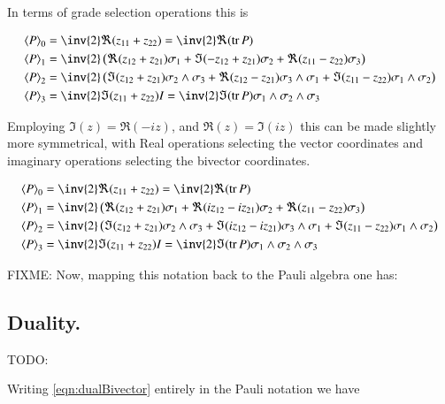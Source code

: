 \documentclass{article}
\DeclareMathOperator{\tr}{tr}
\newcommand{\trace}[1]{\tr{#1}}
\begin{document}
In terms of grade selection operations this is

\begin{align*}
\gpgradezero{P} &= \inv{2} \Re( z_{11} + z_{22} ) = \inv{2} \Re(\trace P) \\
\gpgradeone{P} &= \inv{2} \left(
\Re( z_{12} + z_{21} ) \sigma_1
+\Im( -z_{12} + z_{21} ) \sigma_2
+\Re( z_{11} - z_{22} ) \sigma_3
\right) \\
\gpgradetwo{P}
&= \inv{2} \left(
\Im( z_{12} + z_{21} ) \sigma_2 \wedge \sigma_3
+\Re( z_{12} - z_{21} ) \sigma_3 \wedge \sigma_1
+\Im( z_{11} - z_{22} ) \sigma_1 \wedge \sigma_2
\right) \\
\gpgradethree{P} &= \inv{2} \Im( z_{11} + z_{22} ) I = \inv{2} \Im(\trace P) \sigma_1 \wedge \sigma_2 \wedge \sigma_3
\end{align*}

Employing $\Im(z) = \Re(-iz)$, and $\Re(z) = \Im(iz)$ this can be made slightly more symmetrical, with Real operations
selecting the vector coordinates and imaginary operations selecting the bivector coordinates.

\begin{align*}
\gpgradezero{P} &= \inv{2} \Re( z_{11} + z_{22} ) = \inv{2} \Re(\trace P) \\
\gpgradeone{P} &= \inv{2} \left(
\Re( z_{12} + z_{21} ) \sigma_1
+\Re( iz_{12} - iz_{21} ) \sigma_2
+\Re( z_{11} - z_{22} ) \sigma_3
\right) \\
\gpgradetwo{P}
&= \inv{2} \left(
\Im( z_{12} + z_{21} ) \sigma_2 \wedge \sigma_3
+\Im( iz_{12} - iz_{21} ) \sigma_3 \wedge \sigma_1
+\Im( z_{11} - z_{22} ) \sigma_1 \wedge \sigma_2
\right) \\
\gpgradethree{P} &= \inv{2} \Im( z_{11} + z_{22} ) I = \inv{2} \Im(\trace P) \sigma_1 \wedge \sigma_2 \wedge \sigma_3
\end{align*}

FIXME: Now, mapping this notation back to the Pauli algebra one has:

\subsection{ Duality. }

TODO: 

Writing \ref{eqn:dualBivector} entirely in the Pauli notation we have
\end{document}
